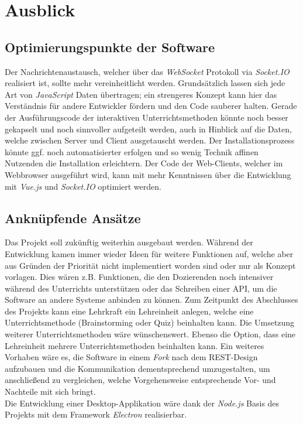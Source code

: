 \section{Ausblick}\label{sec:ausblick}
% 
\subsection{Optimierungspunkte der Software}\label{sec:opti}
Der Nachrichtenaustausch, welcher über das \emph{WebSocket} Protokoll via \emph{Socket.IO} realisiert ist, sollte mehr vereinheitlicht werden. Grundsätzlich lassen sich jede Art von \emph{JavaScript} Daten übertragen; ein strengeres Konzept kann hier das Verständnis für andere Entwickler fördern und den Code sauberer halten. Gerade der Ausführungscode der interaktiven Unterrichtsmethoden könnte noch besser gekapselt und noch sinnvoller aufgeteilt werden, auch in Hinblick auf die Daten, welche zwischen Server und Client ausgetauscht werden. Der Installationsprozess könnte ggf. noch automatisierter erfolgen und so wenig Technik affinen Nutzenden die Installation erleichtern.   
Der Code der Web-Clients, welcher im Webbrowser ausgeführt wird, kann mit mehr Kenntnissen über die Entwicklung mit \emph{Vue.js} und \emph{Socket.IO} optimiert werden. 
\subsection{Anknüpfende Ansätze}\label{sec:ansatze}
Das Projekt soll zukünftig weiterhin ausgebaut werden. Während der Entwicklung kamen immer wieder Ideen für weitere Funktionen auf, welche aber aus Gründen der Priorität nicht implementiert worden sind oder nur als Konzept vorlagen. Dies wären z.B. Funktionen, die den Dozierenden noch intensiver während des Unterrichts unterstützen oder das Schreiben einer API, um die Software an andere Systeme anbinden zu können. Zum Zeitpunkt des Abschlusses des Projekts kann eine Lehrkraft ein Lehreinheit anlegen, welche eine Unterrichtsmethode (Brainstorming oder Quiz) beinhalten kann. Die Umsetzung weiterer Unterrichtsmethoden wäre wünschenswert. Ebenso die Option, dass eine Lehreinheit mehrere Unterrichtsmethoden beinhalten kann. Ein weiteres Vorhaben wäre es, die Software in einem \emph{Fork} nach dem REST-Design aufzubauen und die Kommunikation dementsprechend umzugestalten, um anschließend zu vergleichen, welche Vorgehensweise entsprechende Vor- und Nachteile mit sich bringt. \\ Die Entwicklung einer Desktop-Applikation wäre dank der 
\emph{Node.js} Basis des Projekts mit dem Framework \emph{Electron} realisierbar.